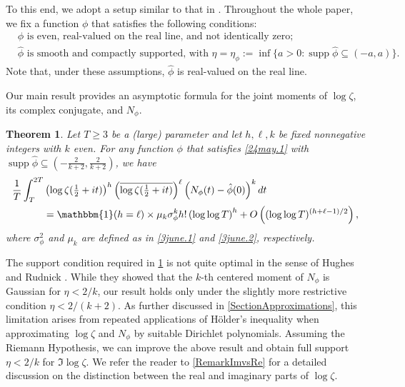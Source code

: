 \documentclass[12pt,oneside,english,a4paper]{amsart}
\newtheorem{thm}{Theorem}[section]
\theoremstyle{remark}
\numberwithin{equation}{section}
\newcommand{\supp}{\operatorname{supp}}
\begin{document}
To this end, we adopt a setup similar to that in \cite{HughesRudnick}. Throughout the whole paper, we fix a function $\phi$ that satisfies the following conditions:
\begin{equation}\begin{split}\label{24may.1}
& \phi \text{ is even, real-valued on the real line, and not identically zero;} \\ 
& \hat \phi \text{ is smooth and compactly supported, with } \eta = \eta_\phi :=\inf\{a>0: \supp \hat\phi \subseteq (-a,a)\}. 
\end{split}\end{equation}
Note that, under these assumptions, $\hat\phi$ is real-valued on the real line.

Our main result provides an asymptotic formula for the joint moments of $\log\zeta$, its complex conjugate, and $N_\phi$.

\begin{thm}\label{mainthm}
    Let $T \ge 3$ be a (large) parameter and let $h,\ell,k$ be fixed nonnegative integers with $k$ even. 
    For any function $\phi$ that satisfies \eqref{24may.1} with $\supp \hat\phi \subseteq (-\frac{2}{k+2},\frac{2}{k+2})$, we have
    \begin{equation}\begin{split}\label{3june.3}
        \frac{1}{T} \int_T^{2T} &\left(\log\zeta(\tfrac{1}{2}+it)\right)^h \left(\overline{\log\zeta(\tfrac{1}{2}+it)} \right)^\ell \left(N_\phi(t)-\hat\phi(0)\right)^k dt \\
        &= \mathbbm{1}(h = \ell) \times \mu_k \sigma_\phi^k h! \left(\log\log T\right)^{h} + O \left( (\log\log T)^{(h + \ell -1)/2} \right),
    \end{split}\end{equation} 
    where $\sigma_\phi^2$ and $\mu_k$ are defined as in \eqref{3june.1} and \eqref{3june.2}, respectively.
\end{thm}

The support condition required in \cref{mainthm} is not quite optimal in the sense of Hughes and Rudnick \cite{HughesRudnick}. While they showed that the $k$-th centered moment of $N_\phi$ is Gaussian for $\eta< 2/k$, our result holds only under the slightly more restrictive condition $\eta<2/(k+2)$. As further discussed in \cref{SectionApproximations}, this limitation arises from repeated applications of H\"older's inequality when approximating $\log\zeta$ and $N_\phi$ by suitable Dirichlet polynomials. Assuming the Riemann Hypothesis, we can improve the above result and obtain full support $\eta<2/k$ for $\Im \log \zeta$. We refer the reader to \cref{RemarkImvsRe} for a detailed discussion on the distinction between the real and imaginary parts of $\log\zeta$.
\end{document}
